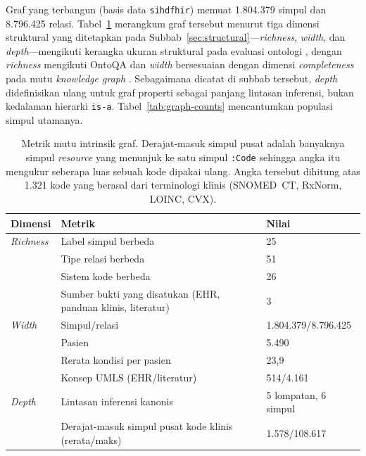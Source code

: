 Graf yang terbangun (basis data \texttt{sihdfhir}) memuat 1.804.379 simpul dan
8.796.425 relasi. Tabel~\ref{tab:graph-scale} merangkum graf tersebut menurut
tiga dimensi struktural yang ditetapkan pada Subbab~\ref{sec:structural}---\emph{richness},
\emph{width}, dan \emph{depth}---mengikuti kerangka ukuran struktural pada evaluasi ontologi
\cite{gangemi2006}, dengan \emph{richness} mengikuti OntoQA \cite{tartir2005} dan
\emph{width} bersesuaian dengan dimensi \emph{completeness} pada mutu \emph{knowledge graph}
\cite{issa2021}. Sebagaimana dicatat di subbab tersebut, \emph{depth} didefinisikan ulang untuk graf
properti sebagai panjang lintasan inferensi, bukan kedalaman hierarki \texttt{is-a}.
Tabel~\ref{tab:graph-counts} mencantumkan populasi simpul utamanya.

\begin{table}[h]
\centering
\caption{Metrik mutu intrinsik graf. Derajat-masuk simpul pusat adalah banyaknya simpul \emph{resource} yang menunjuk ke satu
simpul \texttt{:Code} sehingga angka itu mengukur seberapa luas sebuah kode dipakai ulang. Angka tersebut dihitung
atas 1.321 kode yang berasal dari terminologi klinis (SNOMED~CT, RxNorm, LOINC, CVX).}
\label{tab:graph-scale}
\begin{tabular}{@{}p{24mm}p{68mm}p{46mm}@{}}
\hline
\textbf{Dimensi} & \textbf{Metrik} & \textbf{Nilai} \\
\hline
\emph{Richness} & Label simpul berbeda            & 25 \\
                & Tipe relasi berbeda             & 51 \\
                & Sistem kode berbeda             & 26 \\
                & Sumber bukti yang disatukan (EHR, panduan klinis, literatur) & 3 \\
\emph{Width}    & Simpul/relasi                 & 1.804.379/8.796.425 \\
                & Pasien                          & 5.490 \\
                & Rerata kondisi per pasien       & 23,9 \\
                & Konsep UMLS (EHR/literatur)   & 514/4.161 \\
\emph{Depth}    & Lintasan inferensi kanonis & 5 lompatan, 6 simpul \\
                & Derajat-masuk simpul pusat kode klinis (rerata/maks) & 1.578/108.617 \\
\hline
\end{tabular}
\end{table}


